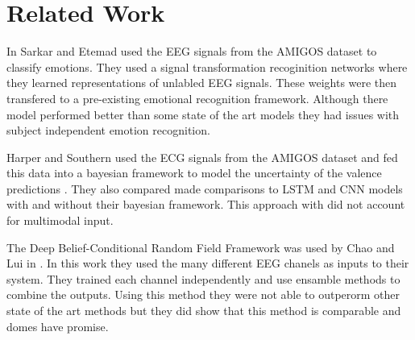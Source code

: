 \section{Related Work}
\label{sec:related_work}
In \cite{sarkar2020selfsupervised} Sarkar and Etemad
used the EEG signals from the AMIGOS dataset to classify emotions.
They used a signal transformation recoginition networks
where they learned representations of unlabled EEG signals.
These weights were then transfered to a pre-existing emotional
recognition framework.
Although there model performed better than some state of the art models
they had issues with subject independent emotion recognition.

Harper and Southern used the ECG signals from the AMIGOS dataset
and fed this data into a bayesian framework to model
the uncertainty of the valence predictions \cite{Harper_2020}.
They also compared made comparisons to LSTM and CNN models with
and without their bayesian framework.
This approach with did not account for multimodal input.

The Deep Belief-Conditional Random Field Framework was used by
Chao and Lui in \cite{8999626}.
In this work they used the many different EEG chanels as inputs to their system.
They trained each channel independently and use ensamble methods to combine the outputs.
Using this method they were not able to outperorm other state of the art methods
but they did show that this method is comparable and domes have promise.
